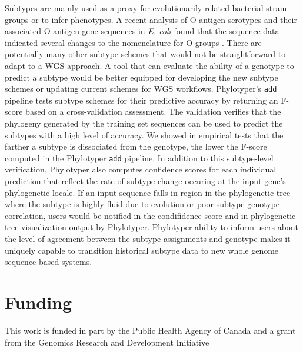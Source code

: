 \documentclass{bioinfo}
\begin{document}
Subtypes are mainly used as a proxy for evolutionarily-related bacterial strain groups or to infer phenotypes.
A recent analysis of O-antigen serotypes and their associated O-antigen gene sequences in \textit{E. coli} found that the sequence data indicated several changes to the nomenclature for O-groups \citep{DebRoy2016}.
There are potentially many other subtype schemes that would not be straightforward to adapt to a WGS approach.
A tool that can evaluate the ability of a genotype to predict a subtype would be better equipped for developing the new subtype schemes or updating current schemes for WGS workflows.
Phylotyper's \texttt{add} pipeline tests subtype schemes for their predictive accuracy by returning an F-score based on a cross-validation assessment.
The validation verifies that the phylogeny generated by the training set sequences can be used to predict the subtypes with a high level of accuracy.
We showed in empirical tests that the farther a subtype is dissociated from the genotype, the lower the F-score computed in the Phylotyper \texttt{add} pipeline.
In addition to this subtype-level verification, Phylotyper also computes confidence scores for each individual prediction that reflect the rate of subtype change occuring at the input gene's phylogenetic locale.
If an input sequence falls in region in the phylogenetic tree where the subtype is highly fluid due to evolution or poor subtype-genotype correlation, users would be notified in the condifidence score and in phylogenetic tree visualization output by Phylotyper. 
Phylotyper ability to inform users about the level of agreement between the subtype assignments and genotype makes it uniquely capable to transition historical subtype data to new whole genome sequence-based systems.\vspace*{-10pt}

\section*{Funding}

This work is funded in part by the Public Health Agency of Canada and a grant from the Genomics Research and Development Initiative\vspace*{-12pt}




\end{document}

